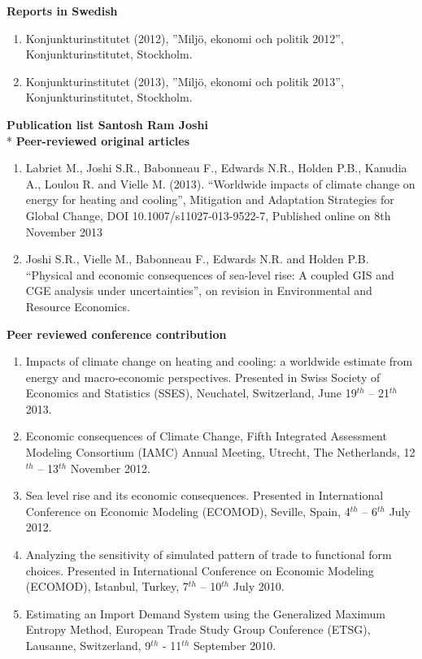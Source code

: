 \documentclass[11pt,a4paper]{extarticle}
\begin{document}
\textbf{Reports in Swedish}
\begin{enumerate}
	\item Konjunkturinstitutet (2012), ”Miljö, ekonomi och politik 2012”, Konjunkturinstitutet, Stockholm.
	\item Konjunkturinstitutet (2013), ”Miljö, ekonomi och politik 2013”, Konjunkturinstitutet, Stockholm.
\end{enumerate}

\textbf{Publication list Santosh Ram Joshi}\\*
\textbf{Peer-reviewed original articles}
\begin{enumerate}
\item Labriet M., Joshi S.R., Babonneau F., Edwards N.R., Holden P.B., Kanudia A.,  Loulou R. and Vielle M. (2013). “Worldwide impacts of climate change on energy for heating and cooling”, Mitigation and Adaptation Strategies for Global Change, DOI 10.1007/s11027-013-9522-7, Published online on 8th November 2013
\item Joshi S.R., Vielle M., Babonneau F., Edwards N.R. and Holden P.B. “Physical and economic consequences of sea-level rise: A coupled GIS and CGE analysis under uncertainties”, on revision in Environmental and Resource Economics.
\end{enumerate}
\textbf{Peer reviewed conference contribution}
\begin{enumerate}
\item Impacts of climate change on heating and cooling: a worldwide estimate from energy and macro-economic perspectives. Presented in Swiss Society of Economics and Statistics (SSES), Neuchatel, Switzerland, June 19$^{th}$ – 21$^{th}$ 2013.
\item Economic consequences of Climate Change, Fifth Integrated Assessment Modeling Consortium (IAMC) Annual Meeting, Utrecht, The Netherlands, 12$^{th}$ – 13$^{th}$ November 2012.
\item Sea level rise and its economic consequences. Presented in International Conference on Economic Modeling (ECOMOD), Seville, Spain, 4$^{th}$ – 6$^{th}$ July 2012.
\item Analyzing the sensitivity of simulated pattern of trade to functional form choices. Presented in International Conference on Economic Modeling (ECOMOD), Istanbul, Turkey,  7$^{th}$ – 10$^{th}$ July 2010.
\item Estimating an Import Demand System using the Generalized Maximum Entropy Method,
European Trade Study Group Conference (ETSG), Lausanne, Switzerland, 9$^{th}$ - 11$^{th}$ September 2010.
\end{enumerate}
\end{document}
